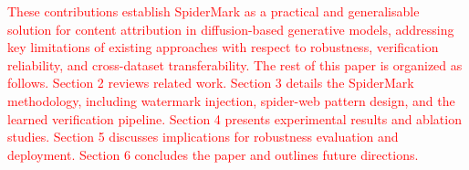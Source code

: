 \textcolor{red}{
These contributions establish SpiderMark as a practical and generalisable solution for content attribution in diffusion-based generative models, addressing key limitations of existing approaches with respect to robustness, verification reliability, and cross-dataset transferability. The rest of this paper is organized as follows. Section 2 reviews related work. Section 3 details the SpiderMark methodology, including watermark injection, spider-web pattern design, and the learned verification pipeline. Section 4 presents experimental results and ablation studies. Section 5 discusses implications for robustness evaluation and deployment. Section 6 concludes the paper and outlines future directions. }
